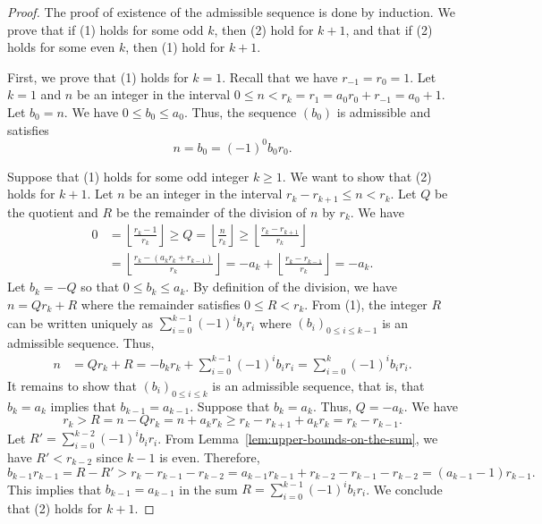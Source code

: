 \documentclass[10pt,a4paper]{amsart}
\begin{document}
\begin{proof}
    The proof of existence of the admissible sequence is done by induction.
    We prove that if (1) holds for some odd $k$, then (2) hold for $k+1$,
    and that if (2) holds for some even $k$, then (1) hold for $k+1$.

    First, we prove that (1) holds for $k=1$.
    Recall that we have $r_{-1}=r_0=1$.
    Let $k=1$ and $n$ be an integer in the interval $0\leq n<r_{k}=r_1=a_0r_0+r_{-1}=a_0+1$.
    Let $b_0=n$. We have $0\leq b_0\leq a_0$. Thus, the sequence $(b_0)$ is admissible
    and satisfies
    \[
        n = b_0 = (-1)^{0}b_0r_0.
    \]

    Suppose that (1) holds for some odd integer $k\geq1$.
    We want to show that (2) holds for $k+1$.
    Let $n$ be an integer in the interval
    $r_{k}-r_{k+1}\leq n< r_{k}$.
    Let $Q$ be the quotient and $R$ be the remainder
    of the division of $n$ by $r_{k}$.
    We have
    \begin{align*}
        0
        &=    \left\lfloor
        \frac{r_{k}-1}
             {r_{k}}
            \right\rfloor
        \geq Q
        = \left\lfloor
        \frac{n}
             {r_{k}}
            \right\rfloor
        \geq
            \left\lfloor
        \frac{r_{k}-r_{k+1}}
             {r_{k}}
            \right\rfloor\\
        &=
            \left\lfloor
        \frac{r_{k}-(a_{k}r_{k}+r_{k-1})}
             {r_{k}}
            \right\rfloor
        = - a_{k}
            +
            \left\lfloor
        \frac{r_{k}-r_{k-1}}
             {r_{k}}
            \right\rfloor
        = - a_{k}.
    \end{align*}
    Let $b_{k}=-Q$ so that
    $0\leq b_{k}\leq a_{k}$.
    By definition of the division, we have
    $n=Qr_{k} + R$
    where the remainder satisfies $0\leq R<r_{k}$.
    From (1), the integer $R$
    can be written uniquely as
    $
        \sum_{i=0}^{k-1} (-1)^{i}b_{i}r_{i}
    $
    where $(b_i)_{0\leq i\leq k-1}$ is an admissible sequence.
    Thus,
    \begin{align*}
        n
        &=Qr_{k} + R
         =-b_{k}r_{k} + \sum_{i=0}^{k-1} (-1)^{i}b_{i}r_{i}
         =\sum_{i=0}^{k} (-1)^{i}b_{i}r_{i}.
    \end{align*}
    It remains to show that $(b_i)_{0\leq i\leq k}$ is an admissible sequence,
    that is, that $b_{k}=a_{k}$ implies that $b_{k-1}=a_{k-1}$.
    Suppose that $b_{k}=a_{k}$. Thus, $Q=-a_{k}$.
    We have
    \[
        r_{k}
        > R
        =
        n - Q r_{k}
        =
        n+a_{k}r_{k}
        \geq
        r_{k}-r_{k+1} +a_{k}r_{k}
        =
        r_{k}-r_{k-1}.
    \]
    Let $R'=\sum_{i=0}^{k-2} (-1)^{i}b_{i}r_{i}$.
    From Lemma~\ref{lem:upper-bounds-on-the-sum}, we have $R'<r_{k-2}$ since $k-1$ is even.
    Therefore,
    \[
        b_{k-1}r_{k-1}
        = R - R'
        > r_{k}-r_{k-1} - r_{k-2}
        = a_{k-1}r_{k-1}+r_{k-2}-r_{k-1} - r_{k-2}
        = (a_{k-1}-1)r_{k-1}.
    \]
    This implies that $b_{k-1}=a_{k-1}$ in the sum $R=\sum_{i=0}^{k-1} (-1)^{i}b_{i}r_{i}$.
    We conclude that (2) holds for $k+1$.


\end{proof}
\end{document}
